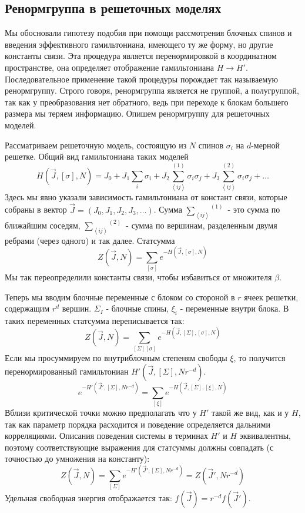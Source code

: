 \documentclass[a4paper,12pt]{article}
\theoremstyle{definition}
\theoremstyle{definition}
\theoremstyle{definition}
\begin{document}
\subsection{Ренормгруппа в решеточных моделях}
\label{sec:renormgroup-lattice-models}
Мы обосновали гипотезу подобия при помощи рассмотрения блочных спинов и введения эффективного гамильтониана, имеющего ту же форму, но другие константы связи. Эта процедура является перенормировкой в координатном пространстве, она определяет отображение гамильтониана $H\to H'$. Последовательное применение такой процедуры порождает так называемую ренормгруппу. Строго говоря, ренормгруппа является не группой, а полугруппой, так как у преобразования нет обратного, ведь при переходе к блокам большего размера мы теряем информацию. 
Опишем ренормгруппу для решеточных моделей.

Рассматриваем решеточную модель, состоящую из $N$ спинов $\sigma_i$ на $d$-мерной решетке. Общий вид гамильтониана таких моделей
\begin{equation}
  \label{eq:55}
  H(\vec J,[\sigma],N)=J_0 + J_1\sum_i \sigma_i +J_2\overset{(1)}{\sum_{\left<ij\right>}}\sigma_i \sigma_j+J_3\overset{(2)}{\sum_{\left<ij\right>}}\sigma_i \sigma_j + \dots
\end{equation}
Здесь мы явно указали зависимость гамильтониана от констант связи, которые собраны в вектор $\vec J=(J_0,J_1,J_2,J_3,\dots)$. Сумма $\overset{(1)}{\sum_{\left<ij\right>}}$ - это сумма по ближайшим соседям, $\overset{(2)}{\sum_{\left<ij\right>}}$ - сумма по вершинам, разделенным двумя ребрами (через одного) и так далее. 
Статсумма
\begin{equation}
  \label{eq:56}
  Z(\vec J,N)=\sum_{[\sigma]}e^{-H(\vec J,[\sigma],N)}
\end{equation}
Мы так переопределили константы связи, чтобы избавиться от множителя $\beta$.

Теперь мы вводим блочные переменные с блоком со стороной в $r$ ячеек решетки, содержащим $r^d$ вершин. $\Sigma_I$ - блочные спины, $\xi_i$ - переменные внутри блока. В таких переменных статсумма переписывается так:
\begin{equation}
  \label{eq:57}
  Z(\vec J,N)=\sum_{[\Sigma][\sigma]}e^{-H(\vec J,[\Sigma],[\sigma],N)}
\end{equation}
Если мы просуммируем по внутриблочным степеням свободы $\xi$, то получится перенормированный гамильтониан $H'(\vec J,[\Sigma],Nr^{-d})$.
\begin{equation}
  \label{eq:58}
  e^{-H'(\vec J',[\Sigma],Nr^{-d})}=\sum_{[\xi]}e^{-H(\vec J,[\Sigma],[\xi],N)}
\end{equation}
Вблизи критической точки можно предполагать что у $H'$ такой же вид, как и у $H$, так как параметр порядка расходится и поведение определяется дальними корреляциями. Описания поведения системы в терминах $H'$ и $H$ эквивалентны, поэтому соответствующие выражения для статсуммы должны совпадать (с точностью до умножения на константу):
\begin{equation}
\label{eq:52}
  Z(\vec J,N)=\sum_{[\Sigma]}e^{-H'(\vec J',[\Sigma],Nr^{-d})}=Z(\vec J',Nr^{-d})
\end{equation}
Удельная свободная энергия отображается так: $f(\vec J)=r^{-d} f(\vec J')$.
\end{document}

